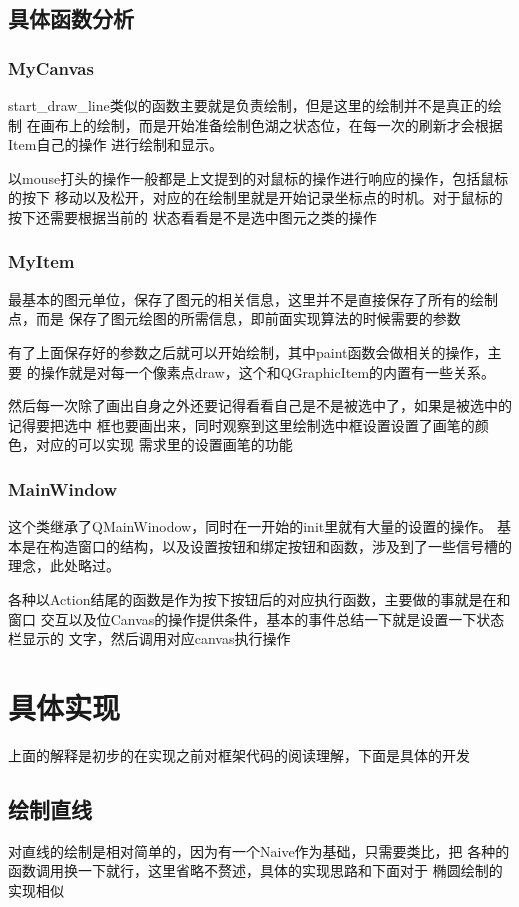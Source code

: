 \documentclass[a4paper,UTF8]{article}
\theoremstyle{definition}
\begin{document}
\subsection{具体函数分析}
\subsubsection{MyCanvas}
start\_draw\_line类似的函数主要就是负责绘制，但是这里的绘制并不是真正的绘制
在画布上的绘制，而是开始准备绘制色湖之状态位，在每一次的刷新才会根据Item自己的操作
进行绘制和显示。

以mouse打头的操作一般都是上文提到的对鼠标的操作进行响应的操作，包括鼠标的按下
移动以及松开，对应的在绘制里就是开始记录坐标点的时机。对于鼠标的按下还需要根据当前的
状态看看是不是选中图元之类的操作

\subsubsection{MyItem}
最基本的图元单位，保存了图元的相关信息，这里并不是直接保存了所有的绘制点，而是
保存了图元绘图的所需信息，即前面实现算法的时候需要的参数

有了上面保存好的参数之后就可以开始绘制，其中paint函数会做相关的操作，主要
的操作就是对每一个像素点draw，这个和QGraphicItem的内置有一些关系。

然后每一次除了画出自身之外还要记得看看自己是不是被选中了，如果是被选中的记得要把选中
框也要画出来，同时观察到这里绘制选中框设置设置了画笔的颜色，对应的可以实现
需求里的设置画笔的功能

\subsubsection{MainWindow}
这个类继承了QMainWinodow，同时在一开始的init里就有大量的设置的操作。
基本是在构造窗口的结构，以及设置按钮和绑定按钮和函数，涉及到了一些信号槽的
理念，此处略过。

各种以Action结尾的函数是作为按下按钮后的对应执行函数，主要做的事就是在和窗口
交互以及位Canvas的操作提供条件，基本的事件总结一下就是设置一下状态栏显示的
文字，然后调用对应canvas执行操作



\section{具体实现}
上面的解释是初步的在实现之前对框架代码的阅读理解，下面是具体的开发

\subsection{绘制直线}
对直线的绘制是相对简单的，因为有一个Naive作为基础，只需要类比，把
各种的函数调用换一下就行，这里省略不赘述，具体的实现思路和下面对于
椭圆绘制的实现相似
\end{document}
